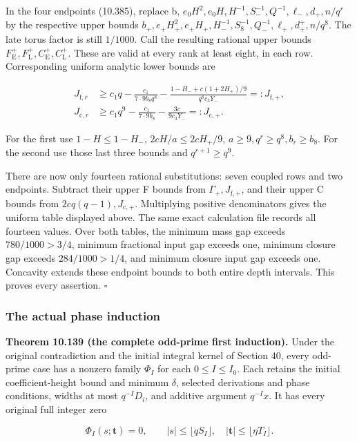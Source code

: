 \documentclass[
  11pt,
  a4paper,
]{article}
\begin{document}
In the four endpoints (10.385), replace b,
\(e_0H^2,e_0H,H^{-1},S_-^{-1},Q^{-1},\ell_-,d_+,n/q^r\) by the
respective upper bounds
\(b_+,e_+H_+^2,e_+H_+,H_-^{-1},S_8^{-1},Q_-^{-1},\ell_+,d_+^+,n/q^8\).
The late torus factor is still \(1/1000\). Call the resulting rational
upper bounds
\(F_{\mathrm E}^+,F_{\mathrm L}^+,C_{\mathrm E}^+,C_{\mathrm L}^+\).
These are valid at every rank at least eight, in each row. Corresponding
uniform analytic lower bounds are

\[
\begin{aligned}
J_{\mathrm f,r}&\ge c_1q-\frac{c_1}{7\cdot9b_8q^8}
-\frac{1-H_-+c(1+2H_+)/9}{q^8c_3Y_-}=:J_{\mathrm f,+},\\
J_{\mathrm c,r}&\ge c_1q^9-\frac{c_1}{7\cdot9b_8}
-\frac{3c}{9c_3Y_-}=:J_{\mathrm c,+}.
\end{aligned}
\tag{10.389}
\]

For the first use \(1-H\le1-H_-\), \(2cH/a\le2cH_+/9\),
\(a\ge9,q^r\ge q^8,b_r\ge b_8\). For the second use those last three
bounds and \(q^{r+1}\ge q^9\).

There are now only fourteen rational substitutions: seven coupled rows
and two endpoints. Subtract their upper F bounds from
\(\Gamma_+,J_{\mathrm f,+}\), and their upper C bounds from
\(2cq(q-1),J_{\mathrm c,+}\). Multiplying positive denominators gives
the uniform table displayed above. The same exact calculation file
records all fourteen values. Over both tables, the minimum mass gap
exceeds \(780/1000>3/4\), minimum fractional input gap exceeds one,
minimum closure gap exceeds \(284/1000>1/4\), and minimum closure input
gap exceeds one. Concavity extends these endpoint bounds to both entire
depth intervals. This proves every assertion. \(\square\)

\subsubsection{The actual phase
induction}\label{the-actual-phase-induction}

\textbf{Theorem 10.139 (the complete odd-prime first induction).} Under
the original contradiction and the initial integral kernel of Section
40, every odd-prime case has a nonzero family \(\Phi_I\) for each
\(0\le I\le I_0\). Each retains the initial coefficient-height bound and
minimum \(\delta\), selected derivations and phase conditions, widths at
most \(q^{-I}D_i\), and additive argument \(q^{-I}x\). It has every
original full integer zero

\[
\Phi_I(s;\boldsymbol t)=0,
\qquad |s|\le\lfloor qS_I\rfloor,\quad
|\boldsymbol t|\le\lfloor\eta T_I\rfloor.
\tag{10.390}
\]
\end{document}
